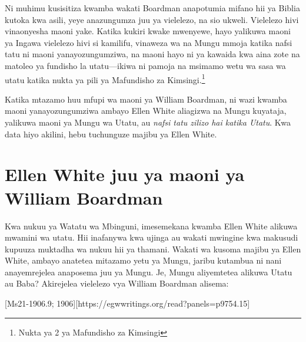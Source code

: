 Ni muhimu kusisitiza kwamba wakati Boardman anapotumia mifano hii ya Biblia kutoka kwa asili, yeye anazungumza juu ya vielelezo, na sio ukweli. Vielelezo hivi vinaonyesha maoni yake. Katika kukiri kwake mwenyewe, hayo yalikuwa maoni ya  Ingawa vielelezo hivi si kamilifu, vinaweza  wa  na  Mungu mmoja katika nafsi tatu ni maoni yanayozungumziwa, na maoni hayo ni ya kawaida kwa aina zote na matoleo ya fundisho la utatu—ikiwa ni pamoja na msimamo wetu wa sasa wa utatu katika nukta ya pili ya Mafundisho za Kimsingi.\footnote{ Nukta ya 2 ya Mafundisho za Kimsingi}

Katika mtazamo huu mfupi wa maoni ya William Boardman, ni wazi kwamba maoni yanayozungumziwa ambayo Ellen White aliagizwa na Mungu kuyataja, yalikuwa maoni ya Mungu wa Utatu, au \textit{nafsi tatu zilizo hai katika Utatu}. Kwa data hiyo akilini, hebu tuchunguze majibu ya Ellen White.

\section*{Ellen White juu ya maoni ya William Boardman}

Kwa nukuu ya Watatu wa Mbinguni, imesemekana kwamba Ellen White alikuwa mwamini wa utatu. Hii inafanywa kwa ujinga au wakati mwingine kwa makusudi kupuuza muktadha wa nukuu hii ya thamani. Wakati wa kusoma majibu ya Ellen White, ambayo anatetea mitazamo yetu ya Mungu, jaribu kutambua ni nani anayemrejelea anaposema juu ya Mungu. Je, Mungu aliyemtetea alikuwa Utatu au Baba? Akirejelea vielelezo vya William Boardman alisema:

[Ms21-1906.9; 1906][https://egwwritings.org/read?panels=p9754.15]

